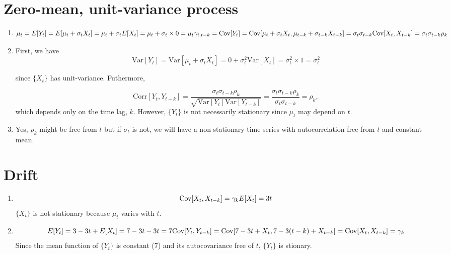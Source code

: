 \documentclass[]{book}
\providecommand{\tightlist}{%
  \setlength{\itemsep}{0pt}\setlength{\parskip}{0pt}}
\begin{document}
\section{Zero-mean, unit-variance
process}\label{zero-mean-unit-variance-process}

\begin{enumerate}
\def\labelenumi{(\alph{enumi})}
\item
  \[
    \mu_t = E[Y_t] = E[\mu_t + \sigma_t X_t] = \mu_t + \sigma_t E[X_t] = \mu_t + \sigma_t \times 0 = \mu_t\\
    \gamma_{t,t-k} = \text{Cov}[Y_t] = \text{Cov}[\mu_t + \sigma_t X_t, \mu_{t-k} + \sigma_{t-k} X_{t-k}] = 
      \sigma_t \sigma_{t-k} \text{Cov}[X_t, X_{t-k}] = \sigma_t \sigma_{t-k} \rho_k
  \]
\item
  First, we have \[
    \text{Var}[Y_t] = \text{Var}[\mu_t + \sigma_t X_t] = 0 + \sigma_t^2 \text{Var}[X_t] = \sigma_t^2 \times 1 = \sigma_t^2
  \]

  since \(\{X_t\}\) has unit-variance. Futhermore,

  \[
    \text{Corr}[Y_t, Y_{t-k}] = \frac{\sigma_t \sigma_{t-k} \rho_k}{\sqrt{\text{Var}[Y_t]\text{Var}[Y_{t-k}]}} = 
      \frac{\sigma_t \sigma_{t-k}\rho_k}{\sigma_t \sigma_{t-k}} = \rho_k,
  \] which depends only on the time lag, \(k\). However, \(\{Y_t\}\) is
  not necessarily stationary since \(\mu_t\) may depend on \(t\).
\item
  Yes, \(\rho_k\) might be free from \(t\) but if \(\sigma_t\) is not,
  we will have a non-stationary time series with autocorrelation free
  from \(t\) and constant mean.
\end{enumerate}

\section{Drift}\label{drift}

\begin{enumerate}
\def\labelenumi{(\alph{enumi})}
\tightlist
\item
  \[
    \text{Cov}[X_t, X_{t-k}] = \gamma_k\\
    E[X_t] = 3t
  \] \(\{X_t\}\) is not stationary because \(\mu_t\) varies with \(t\).
\item
  \[
    E[Y_t] = 3 - 3t+E[X_t] = 7 - 3t - 3t = 7\\
    \text{Cov}[Y_t, Y_{t-k}] = \text{Cov}[7-3t+X_t,7-3(t-k)+X_{t-k}] = \text{Cov}[X_t, X_{t-k}] = \gamma_k
  \] Since the mean function of \(\{Y_t\}\) is constant (7) and its
  autocovariance free of \(t\), \(\{Y_t\}\) is stionary.
\end{enumerate}
\end{document}
